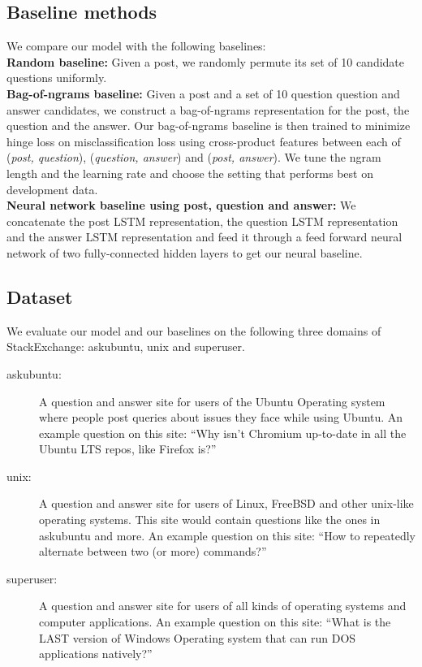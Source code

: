 \documentclass[11pt]{report}
\begin{document}
\subsection{Baseline methods}\label{baselines}

We compare our model with the following baselines:\\
\textbf{Random baseline:} Given a post, we randomly permute its set of 10 candidate questions uniformly.\\
\textbf{Bag-of-ngrams baseline:} Given a post and a set of 10 question question and answer candidates, we construct a bag-of-ngrams representation for the post, the question and the answer. Our bag-of-ngrams baseline is then trained to minimize hinge loss on misclassification loss using cross-product features between each of (\textit{post, question}), (\textit{question, answer}) and (\textit{post, answer}). We tune the ngram length and the learning rate and choose the setting that performs best on development data.\\
\textbf{Neural network baseline using post, question and answer:} We concatenate the post LSTM representation, the question LSTM representation and the answer LSTM representation and feed it through a feed forward neural network of two fully-connected hidden layers to get our neural baseline. 

\subsection{Dataset}\label{dataset}
We evaluate our model and our baselines on the following three domains of StackExchange: askubuntu, unix and superuser.
 \begin{description}
 \item[askubuntu:]  A question and answer site for users of the Ubuntu Operating system where people post queries about issues they face while using Ubuntu. An example question on this site: ``\textsf{\small Why isn't Chromium up-to-date in all the Ubuntu LTS repos, like Firefox is?}''
 \item[unix:]  A question and answer site for users of Linux, FreeBSD and other unix-like operating systems. This site would contain questions like the ones in askubuntu and more. An example question on this site: ``\textsf{\small How to repeatedly alternate between two (or more) commands?}''
 \item[superuser:] A question and answer site for users of all kinds of operating systems and computer applications. An example question on this site: ``\textsf{\small What is the LAST version of Windows Operating system that can run DOS applications natively?}''
 \end{description}
\end{document}
